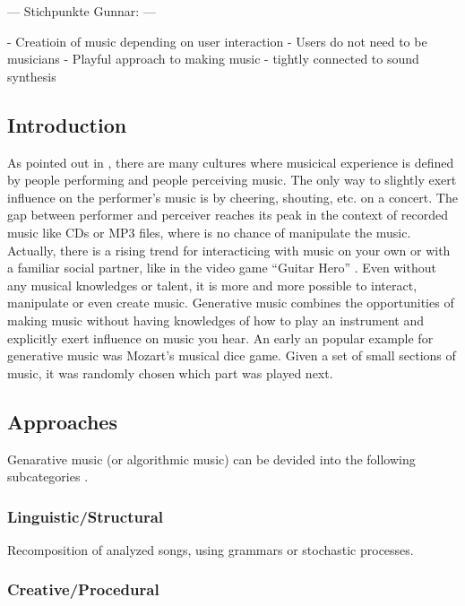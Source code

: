 	
	  --- Stichpunkte Gunnar: ---
	  
	  - Creatioin of music depending on user interaction
	  - Users do not need to be musicians
	  - Playful approach to making music
	  - tightly connected to sound synthesis
	  

	\subsection{Introduction}

	As pointed out in \cite{Chandra2012}, there are many cultures where musicical experience is defined by people performing and people perceiving music. 
	The only way to slightly exert influence on the performer's music is by cheering, shouting, etc. on a concert. 
	The gap between performer and perceiver reaches its peak in the context of recorded music like CDs or MP3 files, where is no chance of manipulate the music. 
	Actually, there is a rising trend for interacticing with music on your own or with a familiar social partner, like in the video game "`Guitar Hero"' \cite{Chandra2012, Planck2009}. 
	Even without any musical knowledges or talent, it is more and more possible to interact, manipulate or even create music.
	Generative music combines the opportunities of making music without having knowledges of how to play an instrument and explicitly exert influence on music you hear.
	An early an popular example for generative music was Mozart's musical dice game. Given a set of small sections of music, it was randomly chosen which part was played next.



	\subsection{Approaches} 

	Genarative music (or algorithmic music) can be devided into the following subcategories \cite{Wooller2005}.

	\subsubsection{Linguistic/Structural}

	Recomposition of analyzed songs, using grammars or stochastic processes. 

	\subsubsection{Creative/Procedural}

